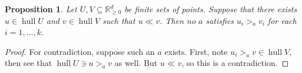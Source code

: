 \documentclass[12pt]{article}
\newtheorem{proposition}[theorem]{Proposition}
\newcommand{\Rgz}{\mathbb{R}_{\ge 0}}
\DeclareMathOperator*{\hull}{hull}
\newcommand{\1}[1]{\mathds{1}[{#1}]}
\begin{document}
    \begin{proposition}\label{prop:domHull}
      Let $U, V \subseteq \Rgz^d$ be finite sets of points.
      Suppose that there exists $u\in \hull U$ and $v\in \hull V$
      such that $u \ll v$.
      Then no $a$ satisfies $u_i >_a v_i$ for each $i=1,\ldots, k$.
    \end{proposition}
    \begin{proof}
      For contradiction, suppose such an $a$ exists.
      First, note $u_i >_a v \in \hull V$,
      then see that $\hull U \ni u >_a v$ as well.
      But $u\ll v$, so this is a contradiction.
    \end{proof}
\end{document}
